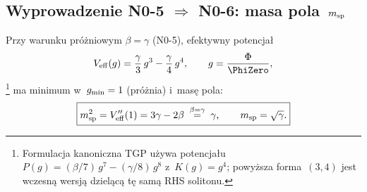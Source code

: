 \subsection{Wyprowadzenie N0-5 $\Rightarrow$ N0-6: masa pola~$m_{\rm sp}$}%
\label{ssec:N0-derivation}

\begin{proposition}[N0-6 wynika z~N0-5]%
\label{prop:N0-6-from-N0-5}
Przy warunku pr\'o\.zniowym $\beta = \gamma$ (N0-5),
efektywny potencja\l{}
\begin{equation}\label{eq:Veff-N0-5}
  V_{\rm eff}(g) = \frac{\gamma}{3}\,g^3 - \frac{\gamma}{4}\,g^4,
  \qquad g = \frac{\Phi}{\PhiZero},
\end{equation}%
\footnote{Formulacja kanoniczna TGP u\.zywa potencja\l{}u $P(g) = (\beta/7)\,g^7 - (\gamma/8)\,g^8$ z~$K(g) = g^4$; powy\.zsza forma~$(3,4)$ jest wczesn\k{a} wersj\k{a} dziel\k{a}c\k{a} t\k{e} sam\k{a} RHS solitonu.}%
ma minimum w~$g_{\rm min} = 1$ (pr\'o\.znia) i~mas\k{e} pola:
\begin{equation}\label{eq:msp-N0-6}
  \boxed{m_{\rm sp}^2 = V_{\rm eff}''(1) = 3\gamma - 2\beta \;\overset{\beta=\gamma}{=}\; \gamma,
  \qquad m_{\rm sp} = \sqrt{\gamma}.}
\end{equation}
\end{proposition}


